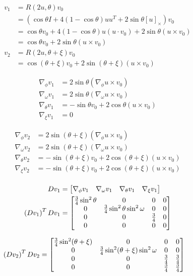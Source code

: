 \documentclass[12pt]{article}
\newcommand*{\Scale}[2][4]{\scalebox{#1}{$#2$}}%
\begin{document}
\begin{align}
v_1 &= R(2u, \theta)v_0 \\
&= \left(\cos\theta I + 4(1-\cos\theta)uu^T + 2\sin\theta[u]_\times\right)v_0 \\
&= \cos\theta v_0 + 4(1-\cos\theta)u(u\cdot v_0) + 2\sin\theta (u\times v_0) \\
&= \cos\theta v_0 + 2\sin\theta (u\times v_0) \\
v_2 &= R(2u, \theta + \xi)v_0 \\
&= \cos(\theta+\xi) v_0 + 2\sin(\theta + \xi) (u\times v_0)
\end{align}


\begin{align}
\nabla_\phi v_1 &= 2\sin\theta(\nabla_\phi u \times v_0) \\
\nabla_\omega v_1 &= 2\sin\theta(\nabla_\omega u \times v_0) \\
\nabla_\theta v_1 &= -\sin\theta v_0 + 2\cos\theta(u\times v_0) \\
\nabla_\xi v_1 &= 0
\end{align}

\begin{align}
\nabla_\phi v_2 &= 2\sin(\theta+\xi)(\nabla_\phi u \times v_0) \\
\nabla_\omega v_2 &= 2\sin(\theta+\xi)(\nabla_\omega u \times v_0) \\
\nabla_\theta v_2 &= -\sin(\theta+\xi) v_0 + 2\cos(\theta+\xi)(u\times v_0) \\
\nabla_\xi v_2 &= -\sin(\theta+\xi) v_0 + 2\cos(\theta+\xi)(u\times v_0) \\
\end{align}


\begin{align}
Dv_1 &= \Scale[1.00]{\begin{bmatrix} 
\nabla_\phi v_1 &
\nabla_\omega v_1 &
\nabla_\theta v_1 &
\nabla_\xi v_1 
\end{bmatrix}} \\
 \left(Dv_1\right)^TDv_1 &= \Scale[1.00]{\begin{bmatrix} 
 \frac{3}{4}\sin^2\theta & 0 & 0 & 0 \\
 0 & \frac{3}{4}\sin^2\theta \sin^2\omega & 0 & 0\\
 0 & 0 & \frac{3}{4}& 0\\
 0 & 0 & 0 & 0 
\end{bmatrix}} 
\end{align} 

\begin{align}
 \left(Dv_2\right)^TDv_2 &= \Scale[1.00]{\begin{bmatrix} 
 \frac{3}{4}\sin^2(\theta+\xi) & 0 & 0 & 0 \\
 0 & \frac{3}{4}\sin^2(\theta+\xi) \sin^2\omega & 0 & 0\\
 0 & 0 & \frac{3}{4} & \frac{3}{4}\\
 0 & 0 & \frac{3}{4} & \frac{3}{4}
\end{bmatrix}} 
\end{align} 
\end{document}
